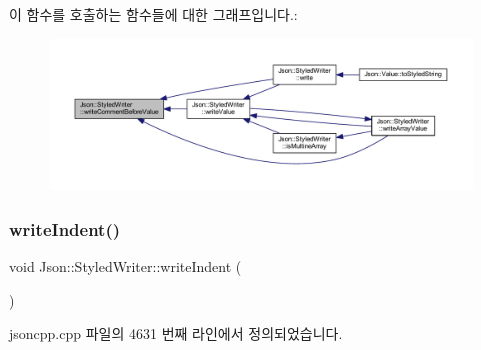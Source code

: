 이 함수를 호출하는 함수들에 대한 그래프입니다.\+:\nopagebreak
\begin{figure}[H]
\begin{center}
\leavevmode
\includegraphics[width=350pt]{class_json_1_1_styled_writer_ad3452c48fabf968bf3693549331ec06e_icgraph}
\end{center}
\end{figure}
\mbox{\label{class_json_1_1_styled_writer_a885f4bfb5701896d60eee6716d2db7e4}} 
\subsubsection{\texorpdfstring{write\+Indent()}{writeIndent()}}
{\footnotesize\ttfamily void Json\+::\+Styled\+Writer\+::write\+Indent (\begin{DoxyParamCaption}{ }\end{DoxyParamCaption})\hspace{0.3cm}{\ttfamily [private]}}



jsoncpp.\+cpp 파일의 4631 번째 라인에서 정의되었습니다.


